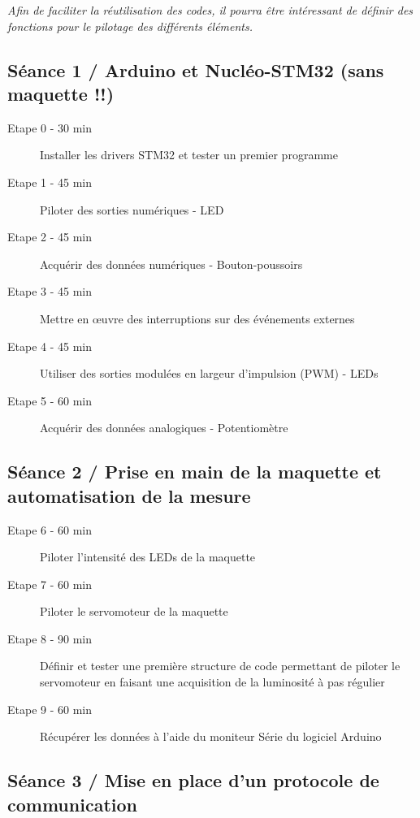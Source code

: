 \documentclass[a4paper,11pt,titlepage]{article} %
\begin{document}
\textit{Afin de faciliter la réutilisation des codes, il pourra être intéressant de définir des fonctions pour le pilotage des différents éléments.}

\subsection{Séance 1 / Arduino et Nucléo-STM32 (sans maquette !!)}

	\begin{description}
		\item[Etape 0 - 30 min] Installer les drivers STM32 et tester un premier programme
		\item[Etape 1 - 45 min] Piloter des sorties numériques - LED
		\item[Etape 2 - 45 min] Acquérir des données numériques - Bouton-poussoirs
		\item[Etape 3 - 45 min] Mettre en \oe{}uvre des interruptions sur des événements externes
		\item[Etape 4 - 45 min] Utiliser des sorties modulées en largeur d'impulsion (PWM) - LEDs
		\item[Etape 5 - 60 min] Acquérir des données analogiques - Potentiomètre
	\end{description}	

\subsection{Séance 2 / Prise en main de la maquette et automatisation de la mesure}

	\begin{description}
		\item[Etape 6 - 60 min] Piloter l'intensité des LEDs de la maquette
		\item[Etape 7 - 60 min] Piloter le servomoteur de la maquette
		\item[Etape 8 - 90 min] Définir et tester une première structure de code permettant de piloter le servomoteur en faisant une acquisition de la luminosité à pas régulier
		\item[Etape 9 - 60 min] Récupérer les données à l'aide du moniteur Série du logiciel Arduino
	\end{description}
	
\subsection{Séance 3 / Mise en place d'un protocole de communication}
\end{document}
